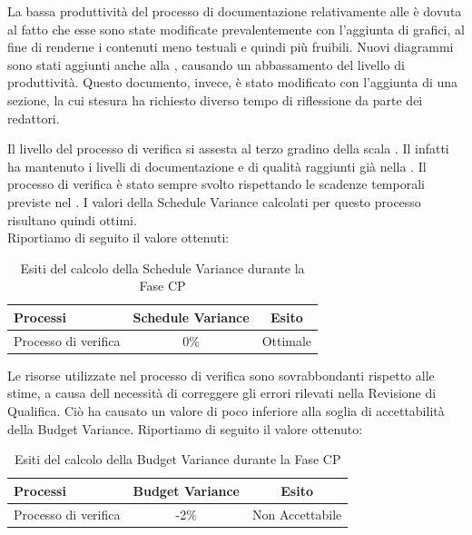 La bassa produttività del processo di documentazione relativamente alle  è dovuta al fatto che esse sono state modificate prevalentemente con l'aggiunta di grafici, al fine di renderne i contenuti meno testuali e quindi più fruibili. Nuovi diagrammi sono stati aggiunti anche alla , causando un abbassamento del livello di produttività. Questo documento, invece, è stato modificato con l'aggiunta di una sezione, la cui stesura ha richiesto diverso tempo di riflessione da parte dei redattori.

	Il livello del processo di verifica si assesta al terzo gradino della scala . Il \groupname{} infatti ha mantenuto i livelli di documentazione e di qualità raggiunti già nella .
	Il processo di verifica è stato sempre svolto rispettando le scadenze temporali previste nel . I valori della Schedule Variance calcolati per questo processo risultano quindi ottimi.\\
			Riportiamo di seguito il valore ottenuti:
			\begin{table}[H]
				\centering
				\begin{tabu}{| l | c | c |}
					\hline
						Processi 							& Schedule Variance	& Esito		\\ \hline \hline
						Processo di verifica & 0\% & Ottimale \\ \hline
				\end{tabu}
				\caption{Esiti del calcolo della Schedule Variance durante la Fase CP}
			\end{table}	

Le risorse utilizzate nel processo di verifica sono sovrabbondanti rispetto alle stime, a causa dell necessità di correggere gli errori rilevati nella Revisione di Qualifica. Ciò ha causato un valore di poco inferiore alla soglia di accettabilità della Budget Variance.
Riportiamo di seguito il valore ottenuto:
\begin{table}[H]
	\centering
	\begin{tabu}{| l | c | c |}
	\hline
	Processi 							& Budget Variance	& Esito		\\ \hline \hline
	Processo di verifica & -2\% & Non Accettabile \\ \hline
	\end{tabu}
	\caption{Esiti del calcolo della Budget Variance durante la Fase CP}
\end{table}	

